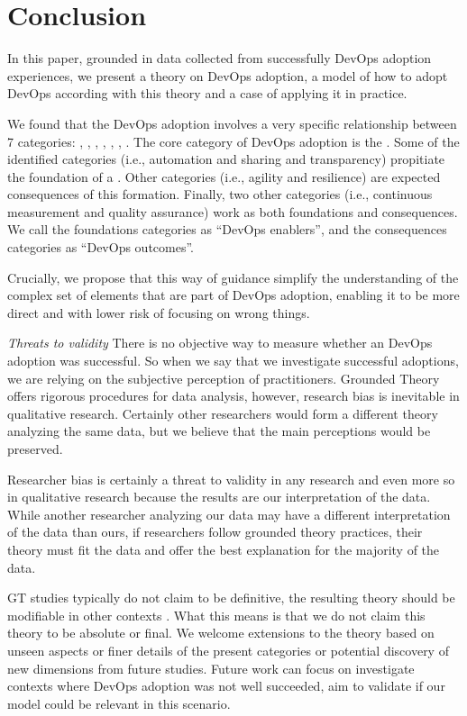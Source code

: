 \section{Conclusion} \label{sec:conclusion}

In this paper, grounded in data collected from successfully DevOps adoption
experiences, we present a theory on DevOps adoption, a model of how to adopt
DevOps according with this theory and a case of applying it in practice.

We found that the DevOps adoption involves a very specific relationship between
7 categories: , , \cc, , , , .
The core category of DevOps adoption is the \cc. Some of the
identified categories (i.e., automation and sharing and transparency) propitiate
the foundation of a \cc. Other categories
(i.e., agility and resilience) are expected consequences of this formation.
Finally, two other categories (i.e., continuous measurement and quality
assurance) work as both foundations and consequences. We call the foundations
categories as ``DevOps enablers'', and the consequences categories as ``DevOps outcomes''.

Crucially, we propose that this way of guidance simplify the understanding of the
complex set of elements that are part of DevOps adoption, enabling it to be
more direct and with lower risk of focusing on wrong things.

\emph{Threats to validity} There is no objective way to measure whether an
DevOps adoption was successful. So when we say that we investigate successful
adoptions, we are relying on the subjective perception of practitioners. Grounded
Theory offers rigorous procedures for data analysis, however, research
bias is inevitable in qualitative research. Certainly other researchers would
form a different theory analyzing the same data, but we believe that the main perceptions
would be preserved.

Researcher bias is certainly a threat to validity in any research
and even more so in qualitative research because the results are
our interpretation of the data. While another researcher analyzing
our data may have a different interpretation of the data than ours, if
researchers follow grounded theory practices, their theory must fit
the data and offer the best explanation for the majority of the data.

GT studies typically do not claim to be definitive, the resulting theory should
be modifiable in other contexts \cite{hoda2012developing}. What this means is that we do not claim
this theory to be absolute or final. We welcome extensions to the theory based
on unseen aspects or finer details of the present categories or potential discovery
of new dimensions from future studies. Future work can focus on investigate contexts
where DevOps adoption was not well succeeded, aim to validate if our model could be
relevant in this scenario.
